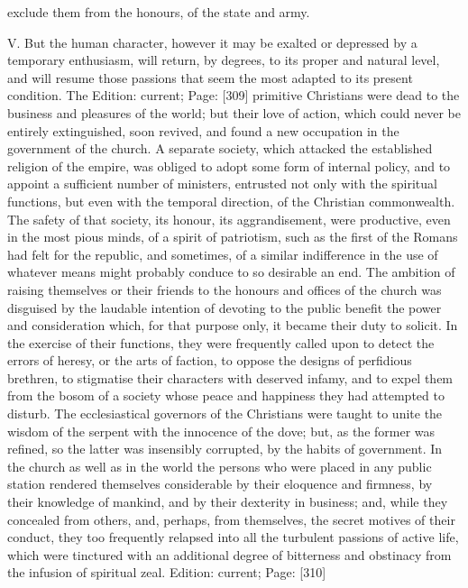 exclude them from the honours, of the state and army.

V. But the human character, however it may be exalted or depressed by a temporary enthusiasm, will return, by degrees, to its proper and natural level, and will resume those passions that seem the most adapted to its present condition. The Edition: current; Page: [309] primitive Christians were dead to the business and pleasures of the world; but their love of action, which could never be entirely extinguished, soon revived, and found a new occupation in the government of the church. A separate society, which attacked the established religion of the empire, was obliged to adopt some form of internal policy, and to appoint a sufficient number of ministers, entrusted not only with the spiritual functions, but even with the temporal direction, of the Christian commonwealth. The safety of that society, its honour, its aggrandisement, were productive, even in the most pious minds, of a spirit of patriotism, such as the first of the Romans had felt for the republic, and sometimes, of a similar indifference in the use of whatever means might probably conduce to so desirable an end. The ambition of raising themselves or their friends to the honours and offices of the church was disguised by the laudable intention of devoting to the public benefit the power and consideration which, for that purpose only, it became their duty to solicit. In the exercise of their functions, they were frequently called upon to detect the errors of heresy, or the arts of faction, to oppose the designs of perfidious brethren, to stigmatise their characters with deserved infamy, and to expel them from the bosom of a society whose peace and happiness they had attempted to disturb. The ecclesiastical governors of the Christians were taught to unite the wisdom of the serpent with the innocence of the dove; but, as the former was refined, so the latter was insensibly corrupted, by the habits of government. In the church as well as in the world the persons who were placed in any public station rendered themselves considerable by their eloquence and firmness, by their knowledge of mankind, and by their dexterity in business; and, while they concealed from others, and, perhaps, from themselves, the secret motives of their conduct, they too frequently relapsed into all the turbulent passions of active life, which were tinctured with an additional degree of bitterness and obstinacy from the infusion of spiritual zeal.
Edition: current; Page: [310]

